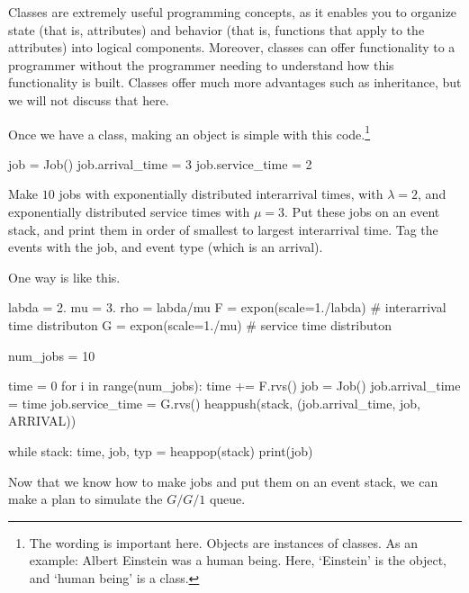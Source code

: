 \documentclass{scrartcl}
\begin{document}
Classes are extremely useful programming concepts, as it enables you to organize state (that is, attributes) and behavior (that is, functions that apply to the attributes) into logical components. Moreover, classes can offer functionality to a programmer without the programmer needing to understand how this functionality is built. Classes offer much more advantages such as inheritance, but we will not discuss that here. 

Once we have a class, making an object is simple with this code.\footnote{The wording is important here. Objects are instances of classes. As an example: Albert Einstein was a human being. Here, `Einstein' is the object, and `human being' is a class.}

\begin{pyblock}
job = Job()
job.arrival_time = 3
job.service_time = 2
\end{pyblock}

\begin{exercise}\label{ex:3}
  Make $10$ jobs with exponentially distributed interarrival times, with $\lambda=2$,  and exponentially distributed service times with $\mu=3$. Put these jobs on an event stack, and print them in order of smallest to largest interarrival time. Tag the events with the job, and event type (which is an arrival).
  \begin{solution}
One way is like this.     
    \begin{pyblock}
labda = 2.
mu = 3.
rho = labda/mu
F = expon(scale=1./labda)  # interarrival time distributon
G = expon(scale=1./mu)  # service time distributon

num_jobs = 10

time = 0
for i in range(num_jobs):
    time += F.rvs()
    job = Job()
    job.arrival_time = time
    job.service_time = G.rvs()
    heappush(stack, (job.arrival_time, job, ARRIVAL))


while stack:
    time, job, typ = heappop(stack)
    print(job)
    
    \end{pyblock}
  \end{solution}
\end{exercise}

Now that we know how to make jobs and put them on an event stack, we can make a plan to simulate the $G/G/1$ queue. 
\end{document}
